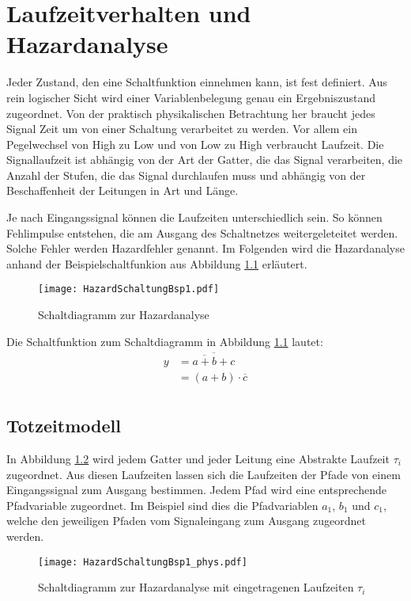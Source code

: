 \chapter{Laufzeitverhalten und Hazardanalyse}
Jeder Zustand, den eine Schaltfunktion einnehmen kann, ist fest definiert. Aus rein logischer Sicht wird einer Variablenbelegung genau ein Ergebniszustand zugeordnet. Von der praktisch physikalischen Betrachtung her braucht jedes Signal Zeit um von einer Schaltung verarbeitet zu werden. Vor allem ein Pegelwechsel von High zu Low und von Low zu High verbraucht Laufzeit. Die Signallaufzeit ist abhängig von der Art der Gatter, die das Signal verarbeiten, die Anzahl der Stufen, die das Signal durchlaufen muss und abhängig von der Beschaffenheit der Leitungen in Art und Länge. 

Je nach Eingangssignal können die Laufzeiten unterschiedlich sein. So können Fehlimpulse entstehen, die am Ausgang des Schaltnetzes weitergeleteitet werden. Solche Fehler werden Hazardfehler genannt. Im Folgenden wird die Hazardanalyse anhand der Beispielschaltfunkion aus Abbildung \ref{SchaltHazBsp1} erläutert.

\begin{figure}[htp]
	\centering
	\texttt{[image: HazardSchaltungBsp1.pdf]}
	\caption{Schaltdiagramm zur Hazardanalyse}
	\label{SchaltHazBsp1}
\end{figure}

Die Schaltfunktion zum Schaltdiagramm in Abbildung \ref{SchaltHazBsp1} lautet:
\begin{align*}
	y &= \overline{\overline{a+b} + c} \\
	  &= (a+b) \cdot \overline{c} \\	
\end{align*}

\section{Totzeitmodell}
In Abbildung \ref{SchaltHazBsp1_phys} wird jedem Gatter und jeder Leitung eine Abstrakte Laufzeit $\tau_i$ zugeordnet. Aus diesen Laufzeiten lassen sich die Laufzeiten der Pfade von einem Eingangssignal zum Ausgang bestimmen. Jedem Pfad wird eine entsprechende Pfadvariable zugeordnet. Im Beispiel sind dies die Pfadvariablen $a_1$, $b_1$ und $c_1$, welche den jeweiligen Pfaden vom Signaleingang zum Ausgang zugeordnet werden.
\begin{figure}[htp]
	\centering
	\texttt{[image: HazardSchaltungBsp1\_phys.pdf]}
	\caption{Schaltdiagramm zur Hazardanalyse mit eingetragenen Laufzeiten $\tau_i$}
	\label{SchaltHazBsp1_phys}
\end{figure}

